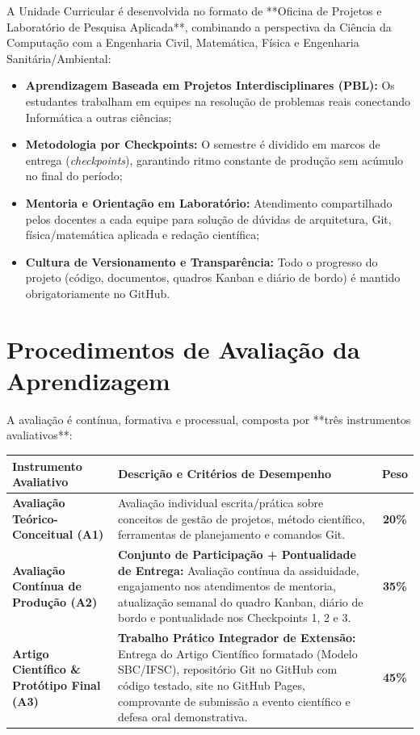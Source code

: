 \documentclass[12pt,a4paper]{article}
\begin{document}
A Unidade Curricular é desenvolvida no formato de **Oficina de Projetos e Laboratório de Pesquisa Aplicada**, combinando a perspectiva da Ciência da Computação com a Engenharia Civil, Matemática, Física e Engenharia Sanitária/Ambiental:

\begin{itemize}[leftmargin=*]
    \item \textbf{Aprendizagem Baseada em Projetos Interdisciplinares (PBL):} Os estudantes trabalham em equipes na resolução de problemas reais conectando Informática a outras ciências;
    \item \textbf{Metodologia por Checkpoints:} O semestre é dividido em marcos de entrega (\textit{checkpoints}), garantindo ritmo constante de produção sem acúmulo no final do período;
    \item \textbf{Mentoria e Orientação em Laboratório:} Atendimento compartilhado pelos docentes a cada equipe para solução de dúvidas de arquitetura, Git, física/matemática aplicada e redação científica;
    \item \textbf{Cultura de Versionamento e Transparência:} Todo o progresso do projeto (código, documentos, quadros Kanban e diário de bordo) é mantido obrigatoriamente no GitHub.
\end{itemize}

\section{Procedimentos de Avaliação da Aprendizagem}

A avaliação é contínua, formativa e processual, composta por **três instrumentos avaliativos**:

\begin{table}[H]
\centering
\small
\begin{tabularx}{\textwidth}{|l|X|c|}
\hline
\rowcolor{cinzaCabecalho}
\textbf{Instrumento Avaliativo} & \textbf{Descrição e Critérios de Desempenho} & \textbf{Peso} \\ \hline
\textbf{Avaliação Teórico-Conceitual (A1)} & Avaliação individual escrita/prática sobre conceitos de gestão de projetos, método científico, ferramentas de planejamento e comandos Git. & \textbf{20\%} \\ \hline
\rowcolor{cinzaLinha}
\textbf{Avaliação Contínua de Produção (A2)} & \textbf{Conjunto de Participação + Pontualidade de Entrega:} Avaliação contínua da assiduidade, engajamento nos atendimentos de mentoria, atualização semanal do quadro Kanban, diário de bordo e pontualidade nos Checkpoints 1, 2 e 3. & \textbf{35\%} \\ \hline
\textbf{Artigo Científico \& Protótipo Final (A3)} & \textbf{Trabalho Prático Integrador de Extensão:} Entrega do Artigo Científico formatado (Modelo SBC/IFSC), repositório Git no GitHub com código testado, site no GitHub Pages, comprovante de submissão a evento científico e defesa oral demonstrativa. & \textbf{45\%} \\ \hline
\end{tabularx}
\end{table}
\end{document}
